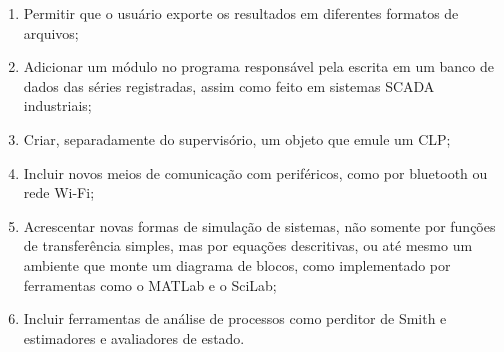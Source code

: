 \begin{enumerate}
	\item Permitir que o usuário exporte os resultados em diferentes formatos de arquivos;
	\item Adicionar um módulo no programa responsável pela escrita em um banco de dados das séries registradas, assim como feito em sistemas SCADA industriais;
	\item Criar, separadamente do supervisório, um objeto que emule um CLP;
	\item Incluir novos meios de comunicação com periféricos, como por bluetooth ou rede Wi-Fi;
	\item Acrescentar novas formas de simulação de sistemas, não somente por funções de transferência simples, mas por equações descritivas, ou até mesmo um ambiente que monte um diagrama de blocos, como implementado por ferramentas como o MATLab\textsuperscript{\tiny \textregistered} e o SciLab;
	\item Incluir ferramentas de análise de processos como perditor de Smith e estimadores e avaliadores de estado.
\end{enumerate}